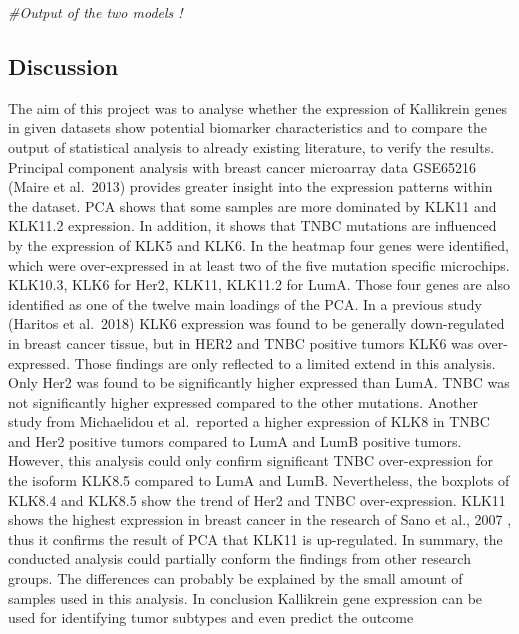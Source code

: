 \documentclass[
]{article}
\newenvironment{Shaded}{\begin{snugshade}}{\end{snugshade}}
\newcommand{\CommentTok}[1]{\textcolor[rgb]{0.56,0.35,0.01}{\textit{#1}}}
\begin{document}
\begin{Shaded}
\begin{Highlighting}[]
\CommentTok{#Output of the two models !}
\end{Highlighting}
\end{Shaded}

\hypertarget{discussion}{%
\subsection{Discussion}\label{discussion}}

The aim of this project was to analyse whether the expression of
Kallikrein genes in given datasets show potential biomarker
characteristics and to compare the output of statistical analysis to
already existing literature, to verify the results. Principal component
analysis with breast cancer microarray data GSE65216 (Maire et al.~2013)
provides greater insight into the expression patterns within the
dataset. PCA shows that some samples are more dominated by KLK11 and
KLK11.2 expression. In addition, it shows that TNBC mutations are
influenced by the expression of KLK5 and KLK6. In the heatmap four genes
were identified, which were over-expressed in at least two of the five
mutation specific microchips. KLK10.3, KLK6 for Her2, KLK11, KLK11.2 for
LumA. Those four genes are also identified as one of the twelve main
loadings of the PCA. In a previous study (Haritos et al.~2018) KLK6
expression was found to be generally down-regulated in breast cancer
tissue, but in HER2 and TNBC positive tumors KLK6 was over-expressed.
Those findings are only reflected to a limited extend in this analysis.
Only Her2 was found to be significantly higher expressed than LumA. TNBC
was not significantly higher expressed compared to the other mutations.
Another study from Michaelidou et al.~reported a higher expression of
KLK8 in TNBC and Her2 positive tumors compared to LumA and LumB positive
tumors. However, this analysis could only confirm significant TNBC
over-expression for the isoform KLK8.5 compared to LumA and LumB.
Nevertheless, the boxplots of KLK8.4 and KLK8.5 show the trend of Her2
and TNBC over-expression. KLK11 shows the highest expression in breast
cancer in the research of Sano et al., 2007 , thus it confirms the
result of PCA that KLK11 is up-regulated. In summary, the conducted
analysis could partially conform the findings from other research
groups. The differences can probably be explained by the small amount of
samples used in this analysis. In conclusion Kallikrein gene expression
can be used for identifying tumor subtypes and even predict the outcome
\end{document}
